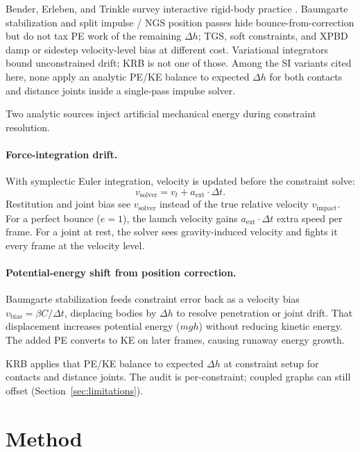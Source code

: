 \documentclass{jcgt}
\begin{document}
Bender, Erleben, and Trinkle survey interactive rigid-body practice \cite{Bender2014}. Baumgarte stabilization \cite{Baumgarte1972} and split impulse / NGS position passes \cite{Catto2014,Catto2024} hide bounce-from-correction but do not tax PE work of the remaining $\Delta h$; TGS, soft constraints, and XPBD \cite{Catto2011,PhysX2024,Macklin2016,Muller2007} damp or sidestep velocity-level bias at different cost. Variational integrators \cite{Hairer2006} bound unconstrained drift; KRB is not one of those. Among the SI variants cited here, none apply an analytic PE/KE balance to expected $\Delta h$ for both contacts and distance joints inside a single-pass impulse solver.

Two analytic sources inject artificial mechanical energy during constraint resolution.

\paragraph{Force-integration drift.}
With symplectic Euler integration, velocity is updated before the constraint solve:
\begin{equation}
v_{\mathrm{solver}} = v_t + a_{\mathrm{ext}} \cdot \Delta t.
\label{eq:force_drift}
\end{equation}
Restitution and joint bias see $v_{\mathrm{solver}}$ instead of the true relative velocity $v_{\mathrm{impact}}$. For a perfect bounce ($e=1$), the launch velocity gains $a_{\mathrm{ext}} \cdot \Delta t$ extra speed per frame. For a joint at rest, the solver sees gravity-induced velocity and fights it every frame at the velocity level.

\paragraph{Potential-energy shift from position correction.}
Baumgarte stabilization \cite{Baumgarte1972} feeds constraint error back as a velocity bias $v_{\mathrm{bias}} = \beta C / \Delta t$, displacing bodies by $\Delta h$ to resolve penetration or joint drift. That displacement increases potential energy ($mgh$) without reducing kinetic energy. The added PE converts to KE on later frames, causing runaway energy growth.

KRB applies that PE/KE balance to expected $\Delta h$ at constraint setup for contacts and distance joints. The audit is per-constraint; coupled graphs can still offset (Section~\ref{sec:limitations}).

\section{Method}
\label{sec:method}
\end{document}
